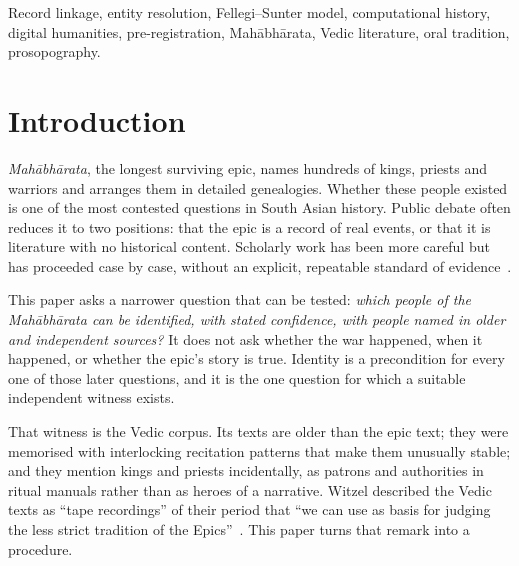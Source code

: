 \documentclass[journal]{IEEEtran}
\newcommand{\MBh}{\textit{Mahābhārata}}
\begin{document}
\begin{IEEEkeywords}
Record linkage, entity resolution, Fellegi--Sunter model, computational history, digital humanities, pre-registration,
Mahābhārata, Vedic literature, oral tradition, prosopography.
\end{IEEEkeywords}

\section{Introduction}
 \MBh{}, the longest surviving epic, names hundreds of kings, priests and warriors and arranges
them in detailed genealogies. Whether these people existed is one of the most contested questions in South Asian
history. Public debate often reduces it to two positions: that the epic is a record of real events, or that it is
literature with no historical content. Scholarly work has been more careful but has proceeded case by case, without
an explicit, repeatable standard of evidence~\cite{brockington1998,hiltebeitel2001,witzel1995}.

This paper asks a narrower question that can be tested: \emph{which people of the \MBh{} can be identified, with
stated confidence, with people named in older and independent sources?} It does not ask whether the war happened,
when it happened, or whether the epic's story is true. Identity is a precondition for every one of those later
questions, and it is the one question for which a suitable independent witness exists.

That witness is the Vedic corpus. Its texts are older than the epic text; they were memorised with interlocking
recitation patterns that make them unusually stable; and they mention kings and priests incidentally, as patrons and
authorities in ritual manuals rather than as heroes of a narrative. Witzel described the Vedic texts as ``tape
recordings'' of their period that ``we can use as basis for judging the less strict tradition of the
Epics''~\cite{witzel1995}. This paper turns that remark into a procedure.
\end{document}
